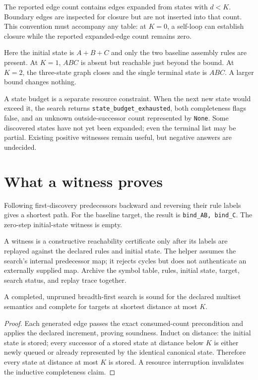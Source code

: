 The reported edge count contains edges expanded from states with $d<K$.
Boundary edges are inspected for closure but are not inserted into that count.
This convention must accompany any table: at $K=0$, a self-loop can establish
closure while the reported expanded-edge count remains zero.

\begin{center}\end{center}
Here the initial state is $A+B+C$ and only the two baseline assembly rules are
present. At $K=1$, $ABC$ is absent but reachable just beyond the bound. At $K=2$,
the three-state graph closes and the single terminal state is $ABC$. A larger
bound changes nothing.

A state budget is a separate resource constraint. When the next new state would
exceed it, the search returns \texttt{state\_budget\_exhausted},
both completeness flags false, and an unknown outside-successor count represented
by \texttt{None}. Some discovered states have not yet been expanded; even the
terminal list may be partial. Existing positive witnesses remain useful, but
negative answers are undecided.

\section{What a witness proves}
Following first-discovery predecessors backward and reversing their rule labels
gives a shortest path. For the baseline target, the result is
\texttt{bind\_AB, bind\_C}. The zero-step initial-state witness is empty.

A witness is a constructive reachability certificate only after its labels are
replayed against the declared rules and initial state. The helper assumes the
search's internal predecessor map; it rejects cycles but does not authenticate
an externally supplied map. Archive the symbol table, rules, initial state,
target, search status, and replay trace together.

\begin{proposition}
A completed, unpruned breadth-first search is sound for the declared multiset
semantics and complete for targets at shortest distance at most $K$.
\end{proposition}
\begin{proof}
Each generated edge passes the exact consumed-count precondition and applies the
declared increment, proving soundness. Induct on distance: the initial state is
stored; every successor of a stored state at distance below $K$ is either newly
queued or already represented by the identical canonical state. Therefore every
state at distance at most $K$ is stored. A resource interruption invalidates the
inductive completeness claim.
\end{proof}

